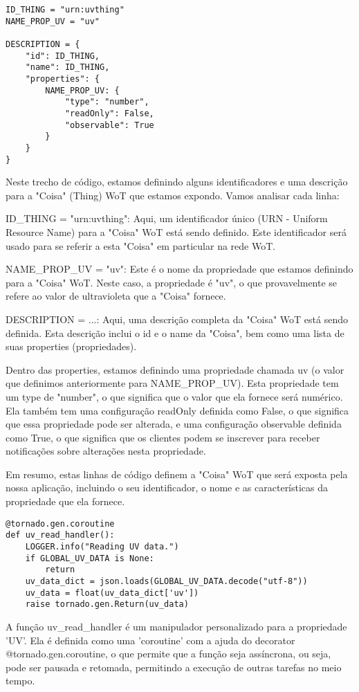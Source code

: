 \begin{verbatim}
ID_THING = "urn:uvthing"
NAME_PROP_UV = "uv"

DESCRIPTION = {
    "id": ID_THING,
    "name": ID_THING,
    "properties": {
        NAME_PROP_UV: {
            "type": "number",
            "readOnly": False,
            "observable": True
        }
    }
}
\end{verbatim}

Neste trecho de código, estamos definindo alguns identificadores e uma descrição para a "Coisa" (Thing) WoT que estamos expondo. Vamos analisar cada linha:

ID\_THING = "urn:uvthing": Aqui, um identificador único (URN - Uniform Resource Name) para a "Coisa" WoT está sendo definido. Este identificador será usado para se referir a esta "Coisa" em particular na rede WoT.

NAME\_PROP\_UV = "uv": Este é o nome da propriedade que estamos definindo para a "Coisa" WoT. Neste caso, a propriedade é "uv", o que provavelmente se refere ao valor de ultravioleta que a "Coisa" fornece.

DESCRIPTION = {...}: Aqui, uma descrição completa da "Coisa" WoT está sendo definida. Esta descrição inclui o id e o name da "Coisa", bem como uma lista de suas properties (propriedades).

Dentro das properties, estamos definindo uma propriedade chamada uv (o valor que definimos anteriormente para NAME\_PROP\_UV). Esta propriedade tem um type de "number", o que significa que o valor que ela fornece será numérico. Ela também tem uma configuração readOnly definida como False, o que significa que essa propriedade pode ser alterada, e uma configuração observable definida como True, o que significa que os clientes podem se inscrever para receber notificações sobre alterações nesta propriedade.

Em resumo, estas linhas de código definem a "Coisa" WoT que será exposta pela nossa aplicação, incluindo o seu identificador, o nome e as características da propriedade que ela fornece.

\begin{verbatim}
@tornado.gen.coroutine
def uv_read_handler():
    LOGGER.info("Reading UV data.")
    if GLOBAL_UV_DATA is None:
        return
    uv_data_dict = json.loads(GLOBAL_UV_DATA.decode("utf-8"))
    uv_data = float(uv_data_dict['uv'])
    raise tornado.gen.Return(uv_data)
\end{verbatim}

A função uv\_read\_handler é um manipulador personalizado para a propriedade 'UV'. Ela é definida como uma 'coroutine' com a ajuda do decorator @tornado.gen.coroutine, o que permite que a função seja assíncrona, ou seja, pode ser pausada e retomada, permitindo a execução de outras tarefas no meio tempo.

